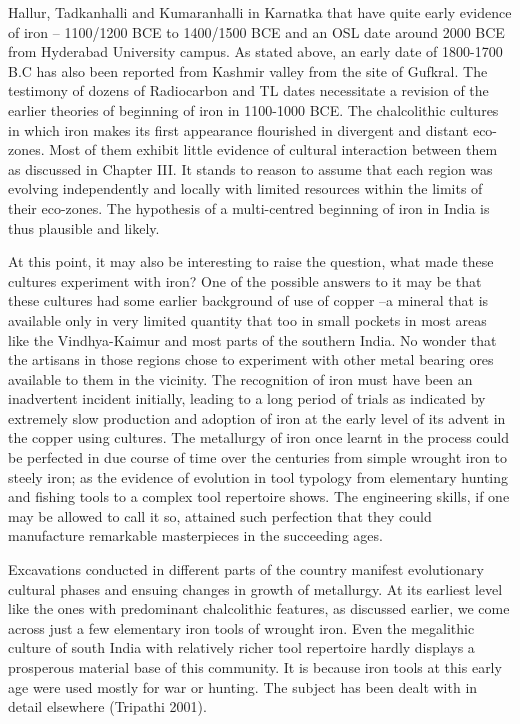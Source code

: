 Hallur, Tadkanhalli and Kumaranhalli in Karnatka that have quite early evidence of iron – 1100/1200 BCE to 1400/1500 BCE and an OSL date around 2000 BCE from Hyderabad University campus. As stated above, an early date of 1800-1700 B.C has also been reported from Kashmir valley from the site of Gufkral. The testimony of dozens of Radiocarbon and TL dates necessitate a revision of the earlier theories of beginning of iron in 1100-1000 BCE.  The chalcolithic cultures in which iron makes its first appearance flourished in divergent and distant eco-zones. Most of them exhibit little evidence of cultural interaction between them as discussed in Chapter III. It stands to reason to assume that each region was evolving independently and locally with limited resources within the limits of their eco-zones. The hypothesis of a multi-centred beginning of iron in India is thus plausible and likely.  

At this point, it may also be interesting to raise the question, what made these cultures experiment with iron? One of the possible answers to it may be that these cultures had some earlier background of use of copper –a mineral that is available only in very limited quantity that too in small pockets in most areas like the Vindhya-Kaimur and most parts of the southern India. No wonder that the artisans in those regions chose to experiment with other metal bearing ores available to them in the vicinity. The recognition of iron must have been an inadvertent incident initially, leading to a long period of trials as indicated by extremely slow production and adoption of iron at the early level of its advent in the copper using cultures. The metallurgy of iron once learnt in the process could be perfected in due course of time over the centuries from simple wrought iron to steely iron; as the evidence of evolution in tool typology from elementary hunting and fishing tools to a complex tool repertoire shows. The engineering skills, if one may be allowed to call it so, attained such perfection that they could manufacture remarkable masterpieces in the succeeding ages. 

Excavations conducted in different parts of the country manifest evolutionary cultural phases and ensuing changes in growth of metallurgy. At its earliest level like the ones with predominant chalcolithic features, as discussed earlier, we come across just a few elementary iron tools of wrought iron. Even the megalithic culture of south India with relatively richer tool repertoire hardly displays a prosperous material base of this community. It is because iron tools at this early age were used mostly for war or hunting. The subject has been dealt with in detail elsewhere (Tripathi 2001).

